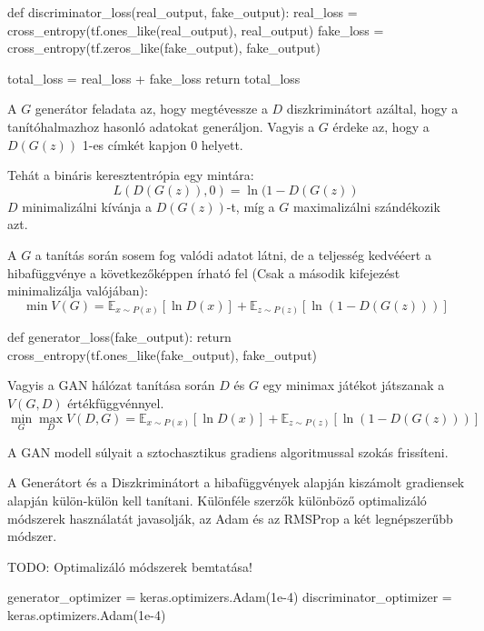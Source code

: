 \begin{python}
def discriminator_loss(real_output, fake_output):
    real_loss = cross_entropy(tf.ones_like(real_output), real_output)
    fake_loss = cross_entropy(tf.zeros_like(fake_output), fake_output)
    
    total_loss = real_loss + fake_loss
    return total_loss
\end{python}



A $G$ generátor feladata az, hogy megtévessze a $D$ diszkriminátort azáltal, hogy a tanítóhalmazhoz hasonló adatokat generáljon.
Vagyis a $G$ érdeke az, hogy a $D(G(z))$ 1-es címkét kapjon 0 helyett.

Tehát a bináris keresztentrópia egy mintára:
$$L(D(G(z)), 0) = \ln(1 - D(G(z))$$
$D$ minimalizálni kívánja a $D(G(z))$-t, míg a $G$ maximalizálni szándékozik azt.

A $G$ a tanítás során sosem fog valódi adatot látni, de a teljesség kedvééert a hibafüggvénye a következőképpen írható fel (Csak a második kifejezést minimalizálja valójában):
$$\min V(G) = \mathbb{E}_{x \sim P(x)} \left[\ln D(x) \right] + \mathbb{E}_{z \sim P(z)} \left[\ln(1 - D(G(z))) \right]$$

\begin{python}
def generator_loss(fake_output):
    return cross_entropy(tf.ones_like(fake_output), fake_output)
\end{python}

Vagyis a GAN hálózat tanítása során $D$ és $G$ egy minimax játékot játszanak a $V(G, D)$ értékfüggvénnyel.
$$\min_{G}\max_{D}V(D, G) =  \mathbb{E}_{x \sim P(x)} \left[\ln D(x) \right] + \mathbb{E}_{z \sim P(z)} \left[\ln(1 - D(G(z))) \right]$$

A GAN modell súlyait a sztochasztikus gradiens algoritmussal szokás frissíteni.

A Generátort és a Diszkriminátort a hibafüggvények alapján kiszámolt gradiensek alapján külön-külön kell tanítani. Különféle szerzők különböző optimalizáló módszerek használatát javasolják, az Adam \cite{kingma2014adam} és az RMSProp a két legnépszerűbb módszer.

TODO: Optimalizáló módszerek bemtatása!

\begin{python}
generator_optimizer = keras.optimizers.Adam(1e-4)
discriminator_optimizer = keras.optimizers.Adam(1e-4)
\end{python}


